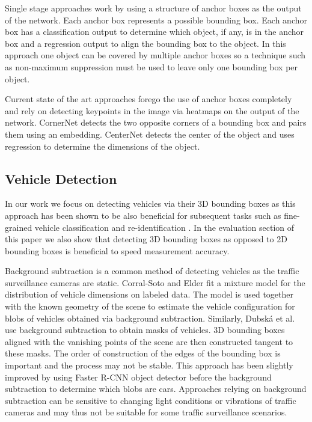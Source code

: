 \documentclass[twocolumn]{svjour3}          \smartqed  \usepackage{graphicx}
\begin{document}
Single stage approaches \cite{RetinaNet,SSD,redmon} work by using a structure of anchor boxes as the output of the network. Each anchor box represents a possible bounding box. Each anchor box has a classification output to determine which object, if any, is in the anchor box and a regression output to align the bounding box to the object. In this approach one object can be covered by multiple anchor boxes so a technique such as non-maximum suppression must be used to leave only one bounding box per object. 

Current state of the art approaches forego the use of anchor boxes completely and rely on detecting keypoints in the image via heatmaps on the output of the network. CornerNet \cite{CornerNet} detects the two opposite corners of a bounding box and pairs them using an embedding. CenterNet \cite{CenterNet} detects the center of the object and uses regression to determine the dimensions of the object.

\subsection{Vehicle Detection}



In our work we focus on detecting vehicles via their 3D bounding boxes as this approach has been shown to be also beneficial for subsequent tasks such as fine-grained vehicle classification \cite{boxcars,perspectivenet} and re-identification \cite{vehiclereid}. In the evaluation section of this paper we also show that detecting 3D bounding boxes as opposed to 2D bounding boxes is beneficial to speed measurement accuracy. 

Background subtraction is a common method of detecting vehicles as the traffic surveillance cameras are static. Corral-Soto and Elder \cite{slotcars} fit a mixture model for the distribution of vehicle dimensions on labeled data. The model is used together with the known geometry of the scene to estimate the vehicle configuration for blobs of vehicles obtained via background subtraction. Similarly, Dubsk\'{a} et al. use background subtraction to obtain masks of vehicles. 3D bounding boxes aligned with the vanishing points of the scene are then constructed tangent to these masks. The order of construction of the edges of the bounding box is important and the process may not be stable. This approach has been slightly improved \cite{sochor2017} by using Faster R-CNN object detector \cite{FasterRCNN} before the background subtraction to determine which blobs are cars. Approaches relying on background subtraction can be sensitive to changing light conditions or vibrations of traffic cameras and may thus not be suitable for some traffic surveillance scenarios.
\end{document}

